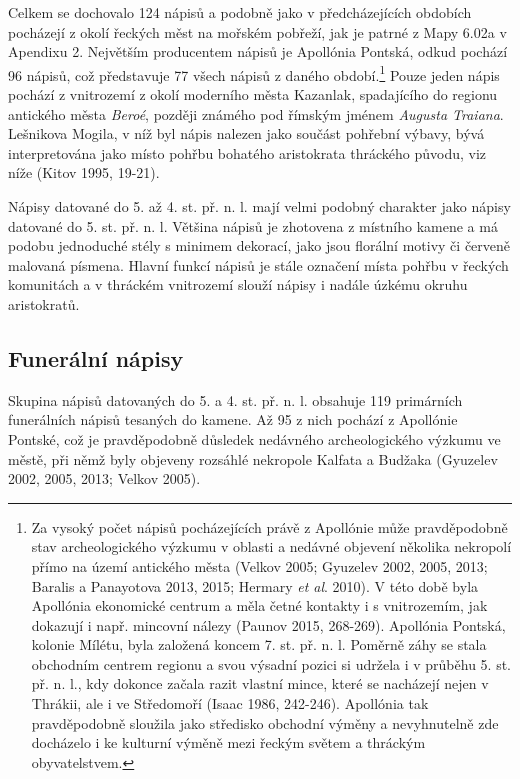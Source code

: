 \NC\AR
\HL
\HL
\stoptable

Celkem se dochovalo 124 nápisů a podobně jako v předcházejících obdobích pocházejí z okolí řeckých měst na mořském pobřeží, jak je patrné z Mapy 6.02a v Apendixu 2. Největším producentem nápisů je Apollónia Pontská, odkud pochází 96 nápisů, což představuje 77  všech nápisů z daného období.\footnote{Za vysoký počet nápisů pocházejících právě z Apollónie může pravděpodobně stav archeologického výzkumu v oblasti a nedávné objevení několika nekropolí přímo na území antického města (Velkov 2005; Gyuzelev 2002, 2005, 2013; Baralis a Panayotova 2013, 2015; Hermary {\em et al}. 2010). V této době byla Apollónia ekonomické centrum a měla četné kontakty i s vnitrozemím, jak dokazují i např. mincovní nálezy (Paunov 2015, 268-269). Apollónia Pontská, kolonie Mílétu, byla založená koncem 7. st. př. n. l. Poměrně záhy se stala obchodním centrem regionu a svou výsadní pozici si udržela i v průběhu 5. st. př. n. l., kdy dokonce začala razit vlastní mince, které se nacházejí nejen v Thrákii, ale i ve Středomoří (Isaac 1986, 242-246). Apollónia tak pravděpodobně sloužila jako středisko obchodní výměny a nevyhnutelně zde docházelo i ke kulturní výměně mezi řeckým světem a thráckým obyvatelstvem.} Pouze jeden nápis pochází z vnitrozemí z okolí moderního města Kazanlak, spadajícího do regionu antického města {\em Beroé}, později známého pod římským jménem {\em Augusta Traiana}. Lešnikova Mogila, v níž byl nápis nalezen jako součást pohřební výbavy, bývá interpretována jako místo pohřbu bohatého aristokrata thráckého původu, viz níže (Kitov 1995, 19-21).

Nápisy datované do 5. až 4. st. př. n. l. mají velmi podobný charakter jako nápisy datované do 5. st. př. n. l. Většina nápisů je zhotovena z místního kamene a má podobu jednoduché stély s minimem dekorací, jako jsou florální motivy či červeně malovaná písmena. Hlavní funkcí nápisů je stále označení místa pohřbu v řeckých komunitách a v thráckém vnitrozemí slouží nápisy i nadále úzkému okruhu aristokratů.

\subsection[funerální-nápisy-2]{Funerální nápisy}

Skupina nápisů datovaných do 5. a 4. st. př. n. l. obsahuje 119 primárních funerálních nápisů tesaných do kamene. Až 95 z nich pochází z Apollónie Pontské, což je pravděpodobně důsledek nedávného archeologického výzkumu ve městě, při němž byly objeveny rozsáhlé nekropole Kalfata a Budžaka (Gyuzelev 2002, 2005, 2013; Velkov 2005).

